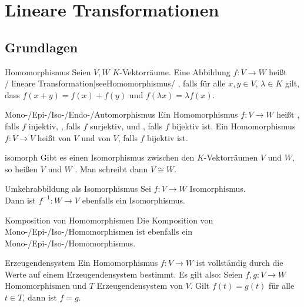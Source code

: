 \chapter{%
    Lineare Transformationen%
}

\section{%
    Grundlagen%
}

\begin{Def}{Homomorphismus}
    Seien $V, W$ $K$-Vektorräume.
    Eine Abbildung $f: V \rightarrow W$ heißt \\
    /%
    {lineare Transformation|see{Homomorphismus}}/%
    , falls für
    alle $x, y \in V$, $\lambda \in K$ gilt, dass
    $f(x + y) = f(x) + f(y)$ und $f(\lambda x) = \lambda f(x)$.
\end{Def}

\begin{Def}{Mono-/Epi-/Iso-/Endo-/Automorphismus}
    Ein Homomorphismus $f: V \rightarrow W$ heißt
    , falls $f$ injektiv,
    , falls $f$ surjektiv, und
    , falls $f$ bijektiv ist.
    Ein Homomorphismus $f: V \rightarrow V$ heißt 
    von $V$ und  von $V$, falls $f$ bijektiv ist.
\end{Def}

\begin{Def}{isomorph}
    Gibt es einen Isomorphismus zwischen den $K$-Vektorräumen $V$ und $W$,
    so heißen $V$ und $W$ .
    Man schreibt dann $V \cong W$.
\end{Def}

\begin{Satz}{Umkehrabbildung als Isomorphismus}
    Sei $f: V \rightarrow W$ Isomorphismus. \\
    Dann ist $f^{-1}: W \rightarrow V$ ebenfalls ein Isomorphismus.
\end{Satz}

\begin{Satz}{Komposition von Homomorphismen}
    Die Komposition von Mono-/Epi-/Iso-/Homomor\-phismen ist ebenfalls ein
    Mono-/Epi-/Iso-/Homomorphismus.
\end{Satz}

\begin{Satz}{Erzeugendensystem}
    Ein Homomorphismus $f: V \rightarrow W$ ist vollständig durch die Werte
    auf einem Erzeugendensystem bestimmt.
    Es gilt also:
    Seien $f, g: V \rightarrow W$ Homomorphismen und $T$
    Erzeugendensystem von $V$.
    Gilt $f(t) = g(t)$ für alle $t \in T$, dann ist $f = g$.
\end{Satz}

